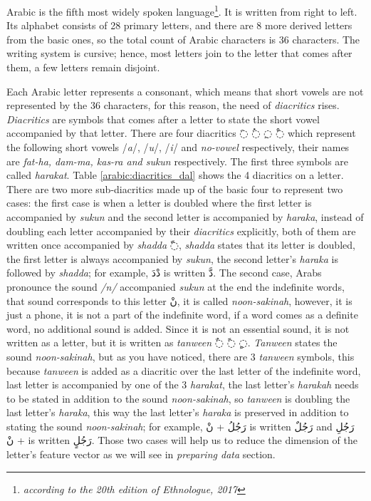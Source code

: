 \documentclass[12pt]{report}
\begin{document}
Arabic is the fifth most widely spoken language\footnote{\textit{according to the
20th edition of Ethnologue, 2017}}. It is written from right to left. Its
alphabet consists of 28 primary letters, and there are 8 more derived letters
from the basic ones, so the total count of Arabic characters is 36 characters.
The writing system is cursive; hence, most letters join to the letter that comes
after them, a few letters remain disjoint.

Each Arabic letter represents a consonant, which means that short vowels are not
represented by the 36 characters, for this reason, the need of \textit{diacritics}
rises. \textit{Diacritics} are symbols that comes after a letter to state the
short vowel accompanied by that letter. There are four diacritics \textarabic{◌َ} \textarabic{◌ُ}
\textarabic{◌ِ} \textarabic{◌ْ} which represent the following short vowels
/\textit{a}/, /\textit{u}/, /\textit{i}/ and \textit{no-vowel} respectively,
their names are \textit{fat-ha, dam-ma, kas-ra and sukun} respectively.  The first
three symbols are called \textit{harakat}. Table \ref{arabic:diacritics_dal}
shows the 4 diacritics on a letter. 
%
There are two more sub-diacritics made up of the basic four to represent two
cases: the first case is when a letter is doubled where the first letter is
accompanied by \textit{sukun} and the second letter is accompanied by
\textit{haraka}, instead of doubling each letter accompanied by their
\textit{diacritics} explicitly, both of them are written once accompanied by
\textit{shadda} \textarabic{◌ّ}, \textit{shadda} states that its letter is
doubled, the first letter is always accompanied by \textit{sukun}, the second
letter's \textit{haraka} is followed by \textit{shadda}; for example,
\textarabic{دْدَ} is written \textarabic{دَّ}.
The second case, Arabs pronounce the sound \textit{/n/} accompanied
\textit{sukun} at the end the indefinite words, that sound corresponds to this
letter \textarabic{نْ}, it is called \textit{noon-sakinah}, however, it is
just a phone, it is not a part of the indefinite word, if a word comes as a
definite word, no additional sound is added. Since it is not an essential sound,
it is not written as a letter, but it is written as  \textit{tanween}
\textarabic{◌ٌ ◌ً ◌ٍ}. 
\textit{Tanween} states the sound \textit{noon-sakinah}, but as you have noticed,
there are 3 \textit{tanween} symbols, this because  \textit{tanween} is added as
a diacritic over the last letter of the indefinite word, last letter is
accompanied by one of the 3 \textit{harakat}, the last letter's \textit{harakah}
needs to be stated in addition to the sound \textit{noon-sakinah}, so
\textit{tanween} is doubling the last letter's \textit{haraka}, this way the last
letter's \textit{haraka} is preserved in addition to stating the sound
\textit{noon-sakinah}; for example, \textarabic{رَجُلُ + نْ} is written
\textarabic{رَجُلٌ} and  \textarabic{رَجُلِ + نْ} is written \textarabic{رَجُلٍ}.
%
Those two cases will help us to reduce the dimension of the letter's feature vector as we
will see in \textit{preparing data} section.
\end{document}
